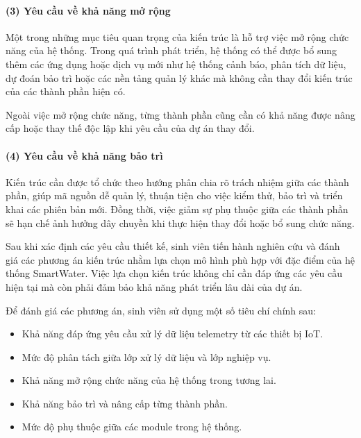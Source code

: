 \paragraph*{(3) Yêu cầu về khả năng mở rộng}

Một trong những mục tiêu quan trọng của kiến trúc là hỗ trợ việc mở rộng chức năng của hệ thống. Trong quá trình phát triển, hệ thống có thể được bổ sung thêm các ứng dụng hoặc dịch vụ mới như hệ thống cảnh báo, phân tích dữ liệu, dự đoán bảo trì hoặc các nền tảng quản lý khác mà không cần thay đổi kiến trúc của các thành phần hiện có.

Ngoài việc mở rộng chức năng, từng thành phần cũng cần có khả năng được nâng cấp hoặc thay thế độc lập khi yêu cầu của dự án thay đổi.

\paragraph*{(4) Yêu cầu về khả năng bảo trì}

Kiến trúc cần được tổ chức theo hướng phân chia rõ trách nhiệm giữa các thành phần, giúp mã nguồn dễ quản lý, thuận tiện cho việc kiểm thử, bảo trì và triển khai các phiên bản mới. Đồng thời, việc giảm sự phụ thuộc giữa các thành phần sẽ hạn chế ảnh hưởng dây chuyền khi thực hiện thay đổi hoặc bổ sung chức năng.


Sau khi xác định các yêu cầu thiết kế, sinh viên tiến hành nghiên cứu và đánh giá các phương án kiến trúc nhằm lựa chọn mô hình phù hợp với đặc điểm của hệ thống SmartWater. Việc lựa chọn kiến trúc không chỉ cần đáp ứng các yêu cầu hiện tại mà còn phải đảm bảo khả năng phát triển lâu dài của dự án.

Để đánh giá các phương án, sinh viên sử dụng một số tiêu chí chính sau:

\begin{itemize}
    \item Khả năng đáp ứng yêu cầu xử lý dữ liệu telemetry từ các thiết bị IoT.
    \item Mức độ phân tách giữa lớp xử lý dữ liệu và lớp nghiệp vụ.
    \item Khả năng mở rộng chức năng của hệ thống trong tương lai.
    \item Khả năng bảo trì và nâng cấp từng thành phần.
    \item Mức độ phụ thuộc giữa các module trong hệ thống.
\end{itemize}

